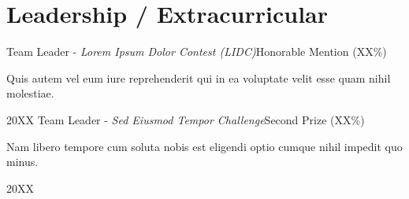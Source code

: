 \section{Leadership / Extracurricular}
  \resumeSubHeadingListStart
    \resumeSubheading
      {Team Leader - \normalfont\emph{Lorem Ipsum Dolor Contest (LIDC)}}{Honorable Mention (XX\%)}
      {\parbox[t]{0.75\linewidth}{Quis autem vel eum iure reprehenderit qui in ea voluptate velit esse quam nihil molestiae.}}{20XX}
    \resumeSubheading
      {Team Leader - \normalfont\emph{Sed Eiusmod Tempor Challenge}}{Second Prize (XX\%)}
      {\parbox[t]{0.75\linewidth}{Nam libero tempore cum soluta nobis est eligendi optio cumque nihil impedit quo minus.}}{20XX}
  \resumeSubHeadingListEnd
